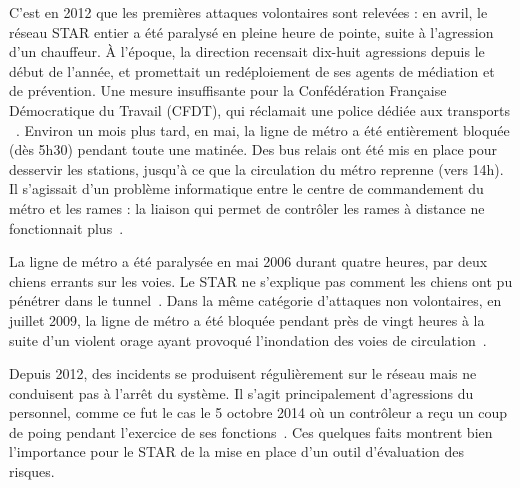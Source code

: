         C'est en 2012 que les premières attaques volontaires sont relevées : en avril, le réseau STAR entier a été paralysé en pleine heure de pointe, suite à l'agression d'un chauffeur. À l'époque, la direction recensait dix-huit agressions depuis le début de l'année, et promettait un redéploiement de ses agents de médiation et de prévention. Une mesure insuffisante pour la Confédération Française Démocratique du Travail (CFDT), qui réclamait \og une police dédiée aux transports \fg ~\cite{bus_agression}. Environ un mois plus tard, en mai, la ligne de métro a été entièrement bloquée (dès 5h30) pendant toute une matinée. Des bus relais ont été mis en place pour desservir les stations, jusqu'à ce que la circulation du métro reprenne (vers 14h). Il s’agissait d’un problème informatique entre le centre de commandement du métro et les rames : la liaison qui permet de contrôler les rames à distance ne fonctionnait plus~\cite{metro_info}. 
        
        La ligne de métro a été paralysée en mai 2006 durant quatre heures, par deux chiens errants sur les voies. Le STAR ne s'explique pas comment les chiens ont pu pénétrer dans le tunnel~\cite{chiens_metro}. Dans la même catégorie d'attaques non volontaires, en juillet 2009, la ligne de métro a été bloquée pendant près de vingt heures à la suite d'un violent orage ayant provoqué l'inondation des voies de circulation~\cite{metro_orage}.
        
        Depuis 2012, des incidents se produisent régulièrement sur le réseau mais ne conduisent pas à l'arrêt du système. Il s'agit principalement d'agressions du personnel, comme ce fut le cas le 5 octobre 2014 où un contrôleur a reçu un coup de poing pendant l'exercice de ses fonctions~\cite{coup_poing_rennes}. Ces quelques faits montrent bien l'importance pour le STAR de la mise en place d'un outil d'évaluation des risques.
